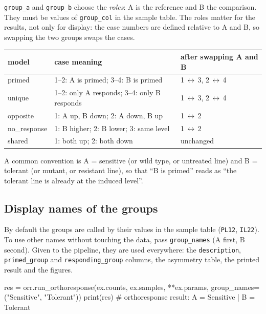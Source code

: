 \documentclass[11pt,a4paper]{article}
\newcommand{\code}[1]{\texttt{\color{navy!85!black}#1}}
\begin{document}
\code{group\_a} and \code{group\_b} choose the \emph{roles}: A is the reference and B the comparison.
They must be values of \code{group\_col} in the sample table. The roles matter for the results, not
only for display: the case numbers are defined relative to A and B, so swapping the two groups swaps
the cases.

\begin{center}
\small
\begin{tabularx}{\linewidth}{l Y Y}
\toprule
\textsf{\textbf{model}} & \textsf{\textbf{case meaning}} & \textsf{\textbf{after swapping A and B}}\\
\midrule
primed & 1--2: A is primed; 3--4: B is primed & 1\,$\leftrightarrow$\,3, 2\,$\leftrightarrow$\,4\\
unique & 1--2: only A responds; 3--4: only B responds & 1\,$\leftrightarrow$\,3, 2\,$\leftrightarrow$\,4\\
opposite & 1: A up, B down; 2: A down, B up & 1\,$\leftrightarrow$\,2\\
no\_response & 1: B higher; 2: B lower; 3: same level & 1\,$\leftrightarrow$\,2\\
shared & 1: both up; 2: both down & unchanged\\
\bottomrule
\end{tabularx}
\end{center}

A common convention is A = sensitive (or wild type, or untreated line) and B = tolerant (or mutant,
or resistant line), so that ``B is primed'' reads as ``the tolerant line is already at the induced
level''.

\subsection{Display names of the groups}

By default the groups are called by their values in the sample table (\code{PL12}, \code{IL22}). To
use other names without touching the data, pass \code{group\_names} (A first, B second). Given to
the pipeline, they are used everywhere: the \code{description}, \code{primed\_group} and
\code{responding\_group} columns, the asymmetry table, the printed result and the figures.

\begin{pycode}
res = orr.run_orthoresponse(ex.counts, ex.samples, **ex.params,
                            group_names=("Sensitive", "Tolerant"))
print(res)        # orthoresponse result: A = Sensitive | B = Tolerant
\end{pycode}
\end{document}
